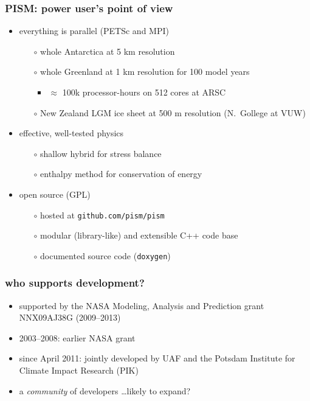 \documentclass[hide notes,intlimits]{beamer}
\begin{document}
\begin{frame}
  \frametitle{PISM: power user's point of view}
  \begin{itemize}
  \item everything is parallel (PETSc and MPI)
    \begin{itemize}
    \item[$\circ$] whole Antarctica at 5 km resolution
    \item[$\circ$] whole Greenland at 1 km resolution for 100 model years
      \begin{itemize}
      \item $\approx$ 100k processor-hours on 512 cores at ARSC
      \end{itemize}
    \item[$\circ$] New Zealand LGM ice sheet at 500 m resolution (N.~Gollege at VUW)
    \end{itemize}
  \item effective, well-tested physics
    \begin{itemize}
    \item[$\circ$] shallow hybrid for stress balance
    \item[$\circ$] enthalpy method for conservation of energy
    \end{itemize}
  \item open source (GPL)
    \begin{itemize}
    \item[$\circ$] hosted at \texttt{github.com/pism/pism}
    \item[$\circ$] modular (library-like) and extensible C++ code base
    \item[$\circ$] documented source code (\texttt{doxygen})
    \end{itemize}
  \end{itemize}
\end{frame}


\begin{frame}
  \frametitle{who supports development?}
  \begin{itemize}
  \item supported by the NASA Modeling, Analysis and Prediction grant NNX09AJ38G
   (2009--2013)
  \item 2003--2008: earlier NASA grant
  \item since April 2011: jointly developed by UAF and the Potsdam
    Institute for Climate Impact Research (PIK)
  \item a \emph{community} of developers \dots likely to expand?
  \end{itemize}
\end{frame}
\end{document}
